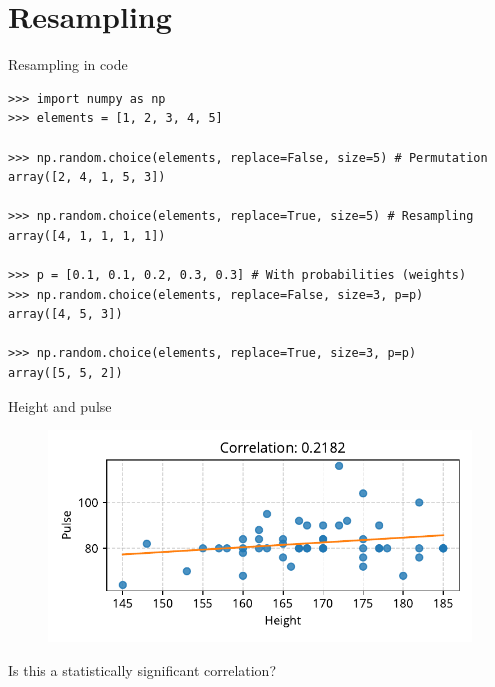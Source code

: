 \documentclass[12pt, aspectratio=149]{beamer}
\theoremstyle{plain}
\begin{document}
\section{Resampling}

\begin{frame}[fragile]{Resampling in code}
\begin{center}
\begin{verbatim} 
>>> import numpy as np
>>> elements = [1, 2, 3, 4, 5]

>>> np.random.choice(elements, replace=False, size=5) # Permutation
array([2, 4, 1, 5, 3])

>>> np.random.choice(elements, replace=True, size=5) # Resampling
array([4, 1, 1, 1, 1])

>>> p = [0.1, 0.1, 0.2, 0.3, 0.3] # With probabilities (weights)
>>> np.random.choice(elements, replace=False, size=3, p=p)
array([4, 5, 3])

>>> np.random.choice(elements, replace=True, size=3, p=p)
array([5, 5, 2])
\end{verbatim}
\end{center}
\end{frame}

\begin{frame}[fragile]{Height and pulse}
\begin{center}
 \begin{figure}
    	\centering
    	\includegraphics[width=0.99\linewidth]{figures/height_pulse_base.pdf}
 \end{figure}
 Is this a statistically significant correlation?
 \end{center}
\end{frame}
\end{document}

